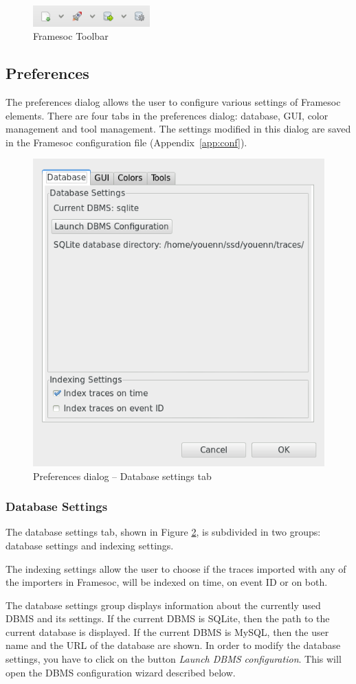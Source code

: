\documentclass[twoside]{article}
\begin{document}
\begin{sloppypar}
\begin{figure}[h!]
  \centering
    \includegraphics[width=0.4\textwidth]{images/toolbar.png}
  \caption{Framesoc Toolbar}
  \label{fig:toolbar}
\end{figure}

\subsection{Preferences}
\label{subsec:pref}
The preferences dialog allows the user to configure various settings of Framesoc elements. There are four tabs in the preferences dialog: database, GUI, color management and tool management. The settings modified in this dialog are saved in the Framesoc configuration file (Appendix~\ref{app:conf}). 

\begin{figure}[h!]
	\centering
	\includegraphics[width=.5\textwidth]{images/pref_db.png}
	\caption{Preferences dialog -- Database settings tab}
	\label{fig:pref_dialog_db}
\end{figure} 

\subsubsection{Database Settings}
The database settings tab, shown in Figure \ref{fig:pref_dialog_db}, is subdivided in two groups: database settings and indexing settings. 

The indexing settings allow the user to choose if the traces imported with any of the importers in Framesoc, will be indexed on time, on event ID or on both. 

The database settings group displays information about the currently used DBMS and its settings. If the current DBMS is SQLite, then the path to the current database is displayed. If the current DBMS is MySQL, then the user name and the URL of the database are shown. In order to modify the database settings, you have to click on the button \textit{Launch DBMS configuration}. This will open the DBMS configuration wizard described below.


\end{sloppypar}
\end{document}

